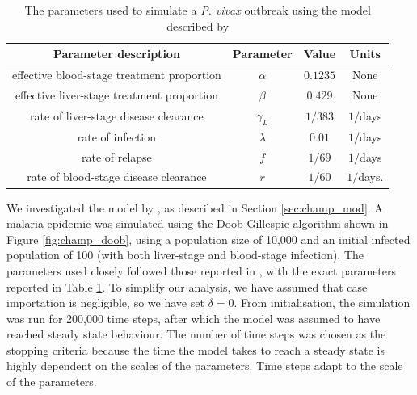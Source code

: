 \begin{table}[htbp]
    \caption[{
                Champagne model parameters
            }]{
        The parameters used to simulate a \textit{P. vivax} outbreak using
        the model described by \cite{champagne_using_2022}
    }
    \label{tab:synth_params}
    \centering
    \begin{tabular}{c | c | c | c}
        Parameter description                      & Parameter
                                                   & Value      & Units     \\
        \hline
        effective blood-stage treatment proportion & $\alpha$
                                                   & $0.1235$   & None      \\
        effective liver-stage treatment proportion & $\beta $
                                                   & $0.429$    & None      \\
        rate of liver-stage disease clearance      & $\gamma_L$
                                                   & $1 / 383$  & $1/$days  \\
        rate of infection                          & $\lambda$
                                                   & $0.01$     & $1/$days  \\
        rate of relapse                            & $f$
                                                   & $1/69$     & $1/$days  \\
        rate of blood-stage disease clearance      & $r$
                                                   & $1/60$     & $1/$days. \\
    \end{tabular}
\end{table}

We investigated the model by \cite{champagne_using_2022}, as described in
Section
\ref{sec:champ_mod}. A malaria epidemic was simulated using the Doob-Gillespie
algorithm shown in Figure \ref{fig:champ_doob}, using a population
size of 10,000 and an initial infected population of 100 
(with both liver-stage and blood-stage
infection). The parameters used closely followed those reported in
\cite{champagne_using_2022}, with the exact parameters reported in Table
\ref{tab:synth_params}. To simplify our analysis, we have assumed that case
importation is negligible, so we have set $\delta = 0.$
From initialisation, the simulation was run for 200,000 time steps,
after which the model was
assumed to have reached steady state behaviour.
The number of time steps was chosen as the stopping criteria
because the time the model takes to reach a steady state is highly dependent
on the scales of the parameters. Time steps adapt to the scale of
the parameters.

